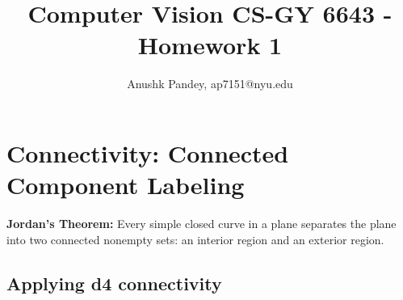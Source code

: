\documentclass[a4paper,11pt]{article}
\makeatletter
\renewcommand{\maketitle}{\bgroup\setlength{\parindent}{0pt}
\begin{flushleft}
  \thispagestyle{plain}
  \textbf{\@title}

  \@author
\end{flushleft}\egroup
}
\makeatother
\begin{document}
\title{\Large Computer Vision CS-GY 6643 - Homework 1
\newline}
\author{Anushk Pandey, ap7151@nyu.edu}



\date{}

\maketitle


\section{Connectivity: Connected Component Labeling}
\textbf{Jordan's Theorem:} Every simple closed curve in a plane
separates the plane into two connected nonempty sets: an interior region
and an exterior region.

\subsection{Applying d4 connectivity}
\end{document}
